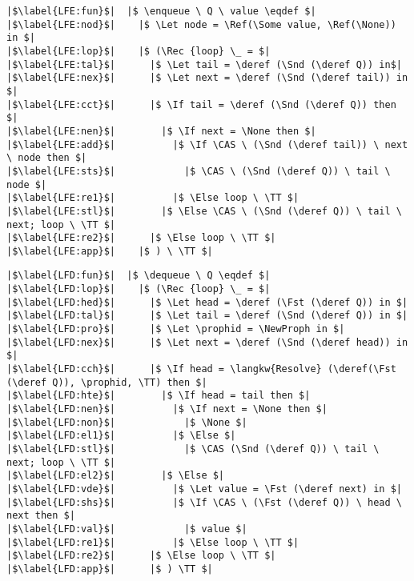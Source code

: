 \documentclass[a4paper, 11pt]{report}
\newcommand{\initialise}{\operatorname{initialize}}
\newcommand{\enqueue}{\operatorname{enqueue}}
\newcommand{\dequeue}{\operatorname{dequeue}}
\begin{document}
\begin{verbatim}
|$\label{LFE:fun}$|  |$ \enqueue \ Q \ value \eqdef $|
|$\label{LFE:nod}$|    |$ \Let node = \Ref(\Some value, \Ref(\None)) in $|
|$\label{LFE:lop}$|    |$ (\Rec {loop} \_ = $|
|$\label{LFE:tal}$|      |$ \Let tail = \deref (\Snd (\deref Q)) in$|
|$\label{LFE:nex}$|      |$ \Let next = \deref (\Snd (\deref tail)) in $|
|$\label{LFE:cct}$|      |$ \If tail = \deref (\Snd (\deref Q)) then $|
|$\label{LFE:nen}$|        |$ \If next = \None then $|
|$\label{LFE:add}$|          |$ \If \CAS \ (\Snd (\deref tail)) \ next \ node then $|
|$\label{LFE:sts}$|            |$ \CAS \ (\Snd (\deref Q)) \ tail \ node $|
|$\label{LFE:re1}$|          |$ \Else loop \ \TT $|
|$\label{LFE:stl}$|        |$ \Else \CAS \ (\Snd (\deref Q)) \ tail \ next; loop \ \TT $|
|$\label{LFE:re2}$|      |$ \Else loop \ \TT $|
|$\label{LFE:app}$|    |$ ) \ \TT $|
\end{verbatim}

\begin{verbatim}
|$\label{LFD:fun}$|  |$ \dequeue \ Q \eqdef $|
|$\label{LFD:lop}$|    |$ (\Rec {loop} \_ = $|
|$\label{LFD:hed}$|      |$ \Let head = \deref (\Fst (\deref Q)) in $|
|$\label{LFD:tal}$|      |$ \Let tail = \deref (\Snd (\deref Q)) in $|
|$\label{LFD:pro}$|      |$ \Let \prophid = \NewProph in $|
|$\label{LFD:nex}$|      |$ \Let next = \deref (\Snd (\deref head)) in $|
|$\label{LFD:cch}$|      |$ \If head = \langkw{Resolve} (\deref(\Fst (\deref Q)), \prophid, \TT) then $|
|$\label{LFD:hte}$|        |$ \If head = tail then $|
|$\label{LFD:nen}$|          |$ \If next = \None then $|
|$\label{LFD:non}$|            |$ \None $|
|$\label{LFD:el1}$|          |$ \Else $|
|$\label{LFD:stl}$|            |$ \CAS (\Snd (\deref Q)) \ tail \ next; loop \ \TT $|
|$\label{LFD:el2}$|        |$ \Else $|
|$\label{LFD:vde}$|          |$ \Let value = \Fst (\deref next) in $|
|$\label{LFD:shs}$|          |$ \If \CAS \ (\Fst (\deref Q)) \ head \ next then $|
|$\label{LFD:val}$|            |$ value $|
|$\label{LFD:re1}$|          |$ \Else loop \ \TT $|
|$\label{LFD:re2}$|      |$ \Else loop \ \TT $|
|$\label{LFD:app}$|      |$ ) \TT $|
\end{verbatim}

\end{document}
